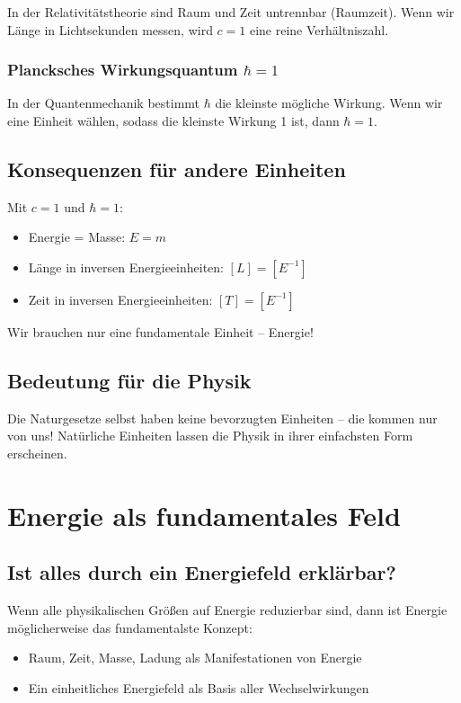 	In der Relativitätstheorie sind Raum und Zeit untrennbar (Raumzeit). Wenn wir Länge in Lichtsekunden messen, wird $c = 1$ eine reine Verhältniszahl.
	
	\subsubsection{Plancksches Wirkungsquantum $\hbar = 1$}
	
	In der Quantenmechanik bestimmt $\hbar$ die kleinste mögliche Wirkung. Wenn wir eine Einheit wählen, sodass die kleinste Wirkung 1 ist, dann $\hbar = 1$.
	
	\subsection{Konsequenzen für andere Einheiten}
	
	Mit $c = 1$ und $\hbar = 1$:
	\begin{itemize}
		\item Energie = Masse: $E = m$
		\item Länge in inversen Energieeinheiten: $[L] = [E^{-1}]$
		\item Zeit in inversen Energieeinheiten: $[T] = [E^{-1}]$
	\end{itemize}
	
	Wir brauchen nur eine fundamentale Einheit – Energie!
	
	\subsection{Bedeutung für die Physik}
	
	Die Naturgesetze selbst haben keine bevorzugten Einheiten – die kommen nur von uns! Natürliche Einheiten lassen die Physik in ihrer einfachsten Form erscheinen.
	
	\section{Energie als fundamentales Feld}
	\label{sec:energy_as_field}
	
	\subsection{Ist alles durch ein Energiefeld erklärbar?}
	
	Wenn alle physikalischen Größen auf Energie reduzierbar sind, dann ist Energie möglicherweise das fundamentalste Konzept:
	\begin{itemize}
		\item Raum, Zeit, Masse, Ladung als Manifestationen von Energie
		\item Ein einheitliches Energiefeld als Basis aller Wechselwirkungen
	\end{itemize}
	
